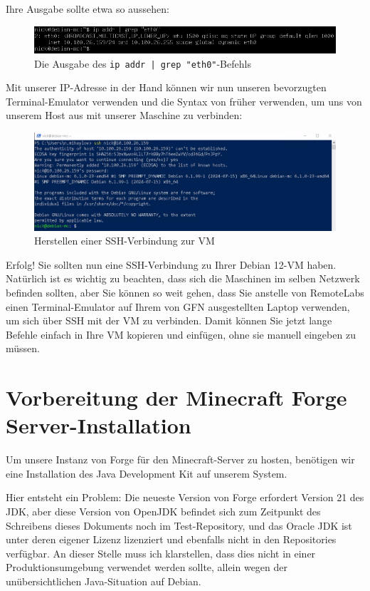 \documentclass[]{article}
\begin{document}
Ihre Ausgabe sollte etwa so aussehen:

\begin{figure}[h!]
	\caption{Die Ausgabe des \texttt{ip addr | grep "eth0"}-Befehls}
	\centering
	\includegraphics[width=1\textwidth]{ip-addr}
\end{figure}
\FloatBarrier

Mit unserer IP-Adresse in der Hand können wir nun unseren bevorzugten Terminal-Emulator verwenden und die Syntax von früher verwenden, um uns von unserem Host aus mit unserer Maschine zu verbinden:

\begin{figure}[h!]
	\caption{Herstellen einer SSH-Verbindung zur VM}
	\centering
	\includegraphics[width=1\textwidth]{ssh}
\end{figure}
\FloatBarrier

Erfolg! Sie sollten nun eine SSH-Verbindung zu Ihrer Debian 12-VM haben. Natürlich ist es wichtig zu beachten, dass sich die Maschinen im selben Netzwerk befinden sollten, aber Sie können so weit gehen, dass Sie anstelle von RemoteLabs einen Terminal-Emulator auf Ihrem von GFN ausgestellten Laptop verwenden, um sich über SSH mit der VM zu verbinden. Damit können Sie jetzt lange Befehle einfach in Ihre VM kopieren und einfügen, ohne sie manuell eingeben zu müssen.

\section{Vorbereitung der Minecraft Forge Server-Installation}

Um unsere Instanz von Forge für den Minecraft-Server zu hosten, benötigen wir eine Installation des Java Development Kit auf unserem System.

Hier entsteht ein Problem: Die neueste Version von Forge erfordert Version 21 des JDK, aber diese Version von OpenJDK befindet sich zum Zeitpunkt des Schreibens dieses Dokuments noch im Test-Repository, und das Oracle JDK ist unter deren eigener Lizenz lizenziert und ebenfalls nicht in den Repositories verfügbar. An dieser Stelle muss ich klarstellen, dass dies nicht in einer Produktionsumgebung verwendet werden sollte, allein wegen der unübersichtlichen Java-Situation auf Debian.
\end{document}
